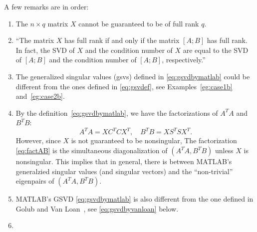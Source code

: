 \noindent A few remarks are in order: 
\begin{enumerate} 
\item The $n\times q$ matrix $X$ cannot be guaranteed 
to be of full rank $q$. 

\item ``The matrix $X$ has full rank if and only if the matrix 
$[A;  B]$ has full rank. 
In fact, the SVD of $X$ and the condition number of $X$ 
are equal to the SVD of $[A; B]$ and the condition number of $[A; B]$, 
respectively.''  

\item The generalized singular values (gsvs) defined
in \eqref{eq:gsvdbymatlab} could be different from the ones 
defined in \eqref{eq:gsvdef}, 
see Examples~\ref{eg:case1b} and~\ref{eg:case2b}. 

\item By the definition~\eqref{eq:gsvdbymatlab}, we have  
the factorizations of $A^TA$ and $B^TB$: 
\begin{equation} \label{eq:factAB}
A^T A = X C^T C X^T, \quad
B^T B = X S^T S X^T. 
\end{equation} 
However, since $X$ is not guaranteed to be nonsingular, 
The factorization \eqref{eq:factAB} is  the simultaneous
diagonalization of $(A^TA, B^TB)$ unless $X$ is nonsingular. 
This implies that in general, there is 
between MATLAB's generalzied singular values (and singular vectors) 
and the ``non-trivial'' eigenpairs of $(A^TA, B^TB)$. 


\item MATLAB's GSVD \eqref{eq:gsvdbymatlab}  is
also different from the one defined in 
Golub and Van Loan~\cite[pp.~309]{golub2013matrix}, 
see \eqref{eq:gsvdbyvanloan} below. 


\item {}  
        
\end{enumerate} 


